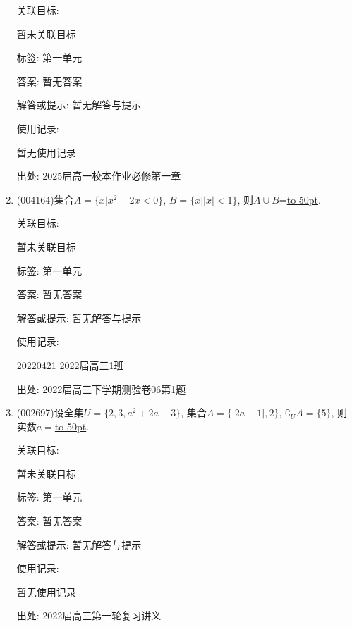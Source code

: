 \documentclass[10pt,a4paper]{article}
\newcommand{\blank}[1]{\underline{\hbox to #1pt{}}}
\begin{document}
\begin{enumerate}[1.]
关联目标:

暂未关联目标



标签: 第一单元

答案: 暂无答案

解答或提示: 暂无解答与提示

使用记录:

暂无使用记录


出处: 2025届高一校本作业必修第一章
\item { (004164)}集合$A=\{x|x^2-2x<0\}$, $B=\{x||x|<1\}$, 则$A\cup B$=\blank{50}.


关联目标:

暂未关联目标



标签: 第一单元

答案: 暂无答案

解答或提示: 暂无解答与提示

使用记录:

20220421	2022届高三1班	


出处: 2022届高三下学期测验卷06第1题
\item { (002697)}设全集$U=\{2,3,a^2+2a-3\}$, 集合$A=\{|2a-1|,2\}$, $\complement_U A=\{5\}$, 则实数$a=$\blank{50}.


关联目标:

暂未关联目标



标签: 第一单元

答案: 暂无答案

解答或提示: 暂无解答与提示

使用记录:

暂无使用记录


出处: 2022届高三第一轮复习讲义
\end{enumerate}
\end{document}
